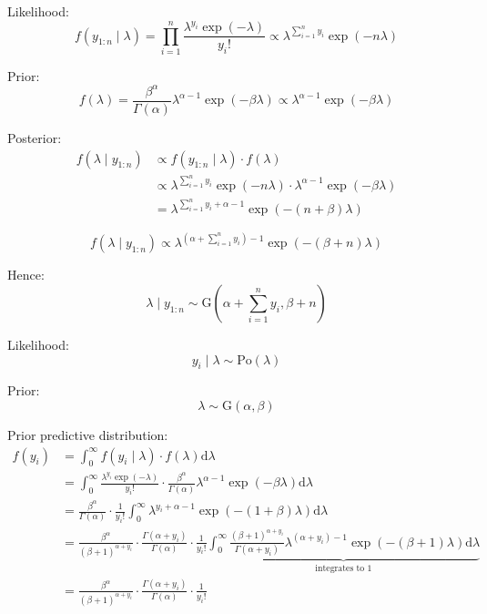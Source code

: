 \documentclass{article}\usepackage[]{graphicx}\usepackage[]{xcolor}
\begin{document}
\begin{multicols*}{2}
Likelihood:
\begin{equation*}
f(y_{1:n}\mid\lambda)=\prod_{i=1}^{n}\frac{\lambda^{y_i}\exp(-\lambda)}{y_i!}
\propto\lambda^{\sum_{i=1}^{n} y_i}\exp(-n\lambda)
\end{equation*}

Prior:
\begin{equation*}
f(\lambda)=\frac{\beta^{\alpha}}{\Gamma(\alpha)}\lambda^{\alpha-1}\exp(-\beta\lambda)
\propto \lambda^{\alpha-1}\exp(-\beta\lambda)
\end{equation*}

Posterior:
\begin{align*}
f(\lambda\mid y_{1:n}) &\propto f(y_{1:n}\mid\lambda)\cdot f(\lambda) \\
&\propto \lambda^{\sum_{i=1}^{n} y_i}\exp(-n\lambda)\cdot 
\lambda^{\alpha-1}\exp(-\beta\lambda) \\
&= \lambda^{\sum_{i=1}^{n} y_i+\alpha-1}\exp(-(n+\beta)\lambda)
\end{align*}

\begin{equation*}
f(\lambda\mid y_{1:n}) \propto
\lambda^{(\alpha+\sum_{i=1}^{n} y_i)-1}\exp(-(\beta+n)\lambda)
\end{equation*}

Hence:
\begin{equation*}
\lambda\mid y_{1:n}\sim\text{G}\left(\alpha+\sum_{i=1}^{n} y_i, \beta+n \right)
\end{equation*}

Likelihood:
\begin{equation*}
y_i\mid\lambda\sim\text{Po}(\lambda)
\end{equation*}

Prior:
\begin{equation*}
\lambda\sim\text{G}(\alpha, \beta)
\end{equation*}

Prior predictive distribution:
\tiny
\begin{align*}
f(y_{i})&=\int_{0}^{\infty}f(y_i\mid\lambda)\cdot f(\lambda)\text{d}\lambda \\
&=\int_{0}^{\infty} \frac{\lambda^{y_i}\exp(-\lambda)}{y_i!}\cdot
\frac{\beta^{\alpha}}{\Gamma(\alpha)}\lambda^{\alpha-1}\exp(-\beta\lambda) \text{d}\lambda \\
&=\frac{\beta^{\alpha}}{\Gamma(\alpha)}\cdot\frac{1}{y_i!}
\int_{0}^{\infty} \lambda^{y_i+\alpha-1}\exp(-(1+\beta)\lambda)\text{d}\lambda \\
&=\frac{\beta^{\alpha}}{(\beta+1)^{\alpha+y_i}}\cdot
\frac{\Gamma(\alpha+y_i)}{\Gamma(\alpha)}\cdot\frac{1}{y_i!}
\underbrace{
\int_{0}^{\infty}\frac{(\beta+1)^{\alpha+y_i}}{\Gamma(\alpha+y_i)}
\lambda^{(\alpha+y_i)-1}\exp(-(\beta+1)\lambda)\text{d}\lambda
}_\text{integrates to 1} \\
&=\frac{\beta^{\alpha}}{(\beta+1)^{\alpha+y_i}}\cdot
\frac{\Gamma(\alpha+y_i)}{\Gamma(\alpha)}\cdot\frac{1}{y_i!}
\end{align*}


\end{multicols*}
\end{document}
